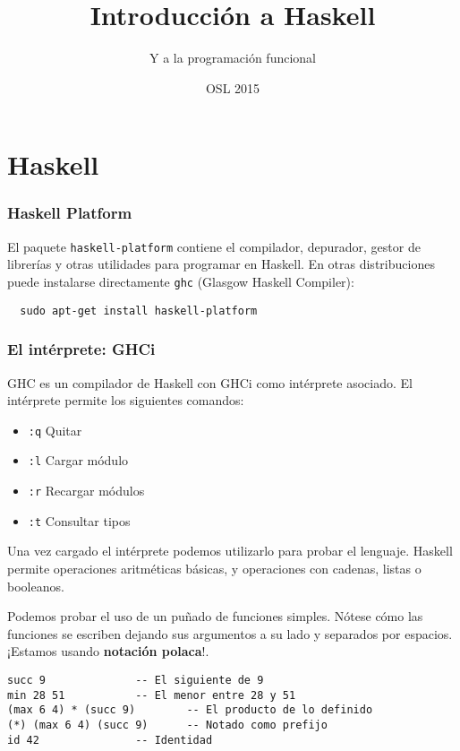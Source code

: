 \documentclass{beamer} %
\title{Introducción a Haskell}  %
\subtitle{Y a la programación funcional}   %
\author[@pbaeyens \and @M42]    %
{\texorpdfstring{
    \begin{columns}
      \column{.45\linewidth}
      \centering
      Pablo Baeyens\\
      \href{http://www.github.com/pbaeyens}{@pbaeyens}
      \column{.45\linewidth}
      \centering
      Mario Román\\
      \href{http://www.github.com/M42}{@M42}
    \end{columns}
}{Pablo Baeyens \and Mario Román}}
\date{OSL 2015} %
\begin{document}
  \frame{\titlepage}



\section{Haskell}
\begin{frame}[fragile]
  \frametitle{Haskell Platform}
  El paquete \texttt{haskell-platform} contiene el compilador, depurador, gestor de 
  librerías y otras utilidades para programar en Haskell.
  En otras distribuciones puede instalarse directamente \texttt{ghc} 
  (Glasgow Haskell Compiler):
  \begin{lstlisting}
  sudo apt-get install haskell-platform
  \end{lstlisting}
\end{frame}

\begin{frame}
  \frametitle{El intérprete: GHCi}
  GHC es un compilador de Haskell con GHCi como intérprete asociado. 
  El intérprete permite los siguientes comandos:
  \begin{itemize}
    \item \texttt{:q} \qquad  Quitar
    \item \texttt{:l} \qquad  Cargar módulo
    \item \texttt{:r} \qquad  Recargar módulos
    \item \texttt{:t} \qquad  Consultar tipos
  \end{itemize}
  
  Una vez cargado el intérprete podemos utilizarlo para probar el lenguaje.
  Haskell permite operaciones aritméticas básicas, y operaciones con
  cadenas, listas o booleanos.
\end{frame}

\begin{frame}
  Podemos probar el uso de un puñado de funciones simples. Nótese cómo las funciones
  se escriben dejando sus argumentos a su lado y separados por espacios. ¡Estamos usando
  \textbf{notación polaca}!.
  
\begin{lstlisting}
succ 9				-- El siguiente de 9
min 28 51			-- El menor entre 28 y 51
(max 6 4) * (succ 9)		-- El producto de lo definido
(*) (max 6 4) (succ 9)		-- Notado como prefijo
id 42				-- Identidad
\end{lstlisting}
\end{frame}
\end{document}
